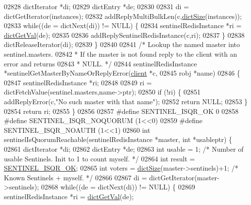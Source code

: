 \begin{DoxyCode}
{{{{{{{{{{{{{{{{{{{{{{{{{{{{{{{{{{{{{{{{{{{{{{{{{{{{{{{{{02828     dictIterator *di;
02829     dictEntry *de;
02830 
02831     di = dictGetIterator(instances);
02832     addReplyMultiBulkLen(c,\hyperlink{dict_8h_af193430dd3d5579a52b194512f72c1f0}{dictSize}(instances));
02833     \textcolor{keywordflow}{while}((de = dictNext(di)) != NULL) \{
02834         sentinelRedisInstance *ri = \hyperlink{dict_8h_ae8d2cc391873b2bea2b87c4f80f43120}{dictGetVal}(de);
02835 
02836         addReplySentinelRedisInstance(c,ri);
02837     \}
02838     dictReleaseIterator(di);
02839 \}
02840 
02841 \textcolor{comment}{/* Lookup the named master into sentinel.masters.}
02842 \textcolor{comment}{ * If the master is not found reply to the client with an error and returns}
02843 \textcolor{comment}{ * NULL. */}
02844 sentinelRedisInstance *sentinelGetMasterByNameOrReplyError(\hyperlink{structclient}{client} *c,
02845                         robj *name)
02846 \{
02847     sentinelRedisInstance *ri;
02848 
02849     ri = dictFetchValue(sentinel.masters,name->ptr);
02850     \textcolor{keywordflow}{if} (!ri) \{
02851         addReplyError(c,\textcolor{stringliteral}{"No such master with that name"});
02852         \textcolor{keywordflow}{return} NULL;
02853     \}
02854     \textcolor{keywordflow}{return} ri;
02855 \}
02856 
02857 \textcolor{preprocessor}{#}\textcolor{preprocessor}{define} \textcolor{preprocessor}{SENTINEL\_ISQR\_OK} 0
02858 \textcolor{preprocessor}{#}\textcolor{preprocessor}{define} \textcolor{preprocessor}{SENTINEL\_ISQR\_NOQUORUM} \textcolor{preprocessor}{(}1\textcolor{preprocessor}{<<}0\textcolor{preprocessor}{)}
02859 \textcolor{preprocessor}{#}\textcolor{preprocessor}{define} \textcolor{preprocessor}{SENTINEL\_ISQR\_NOAUTH} \textcolor{preprocessor}{(}1\textcolor{preprocessor}{<<}1\textcolor{preprocessor}{)}
02860 \textcolor{keywordtype}{int} sentinelIsQuorumReachable(sentinelRedisInstance *master, \textcolor{keywordtype}{int} *usableptr) \{
02861     dictIterator *di;
02862     dictEntry *de;
02863     \textcolor{keywordtype}{int} usable = 1; \textcolor{comment}{/* Number of usable Sentinels. Init to 1 to count myself. */}
02864     \textcolor{keywordtype}{int} result = \hyperlink{sentinel_8c_a8d62015016e2a7110d1e75fcd4681e6a}{SENTINEL\_ISQR\_OK};
02865     \textcolor{keywordtype}{int} voters = \hyperlink{dict_8h_af193430dd3d5579a52b194512f72c1f0}{dictSize}(master->sentinels)+1; \textcolor{comment}{/* Known Sentinels + myself. */}
02866 
02867     di = dictGetIterator(master->sentinels);
02868     \textcolor{keywordflow}{while}((de = dictNext(di)) != NULL) \{
02869         sentinelRedisInstance *ri = \hyperlink{dict_8h_ae8d2cc391873b2bea2b87c4f80f43120}{dictGetVal}(de);
}}}}}}}}}}}}}}}}}}}}}}}}}}}}}}}}}}}}}}}}}}}}}}}}}}}}}}}}}
\end{DoxyCode}
